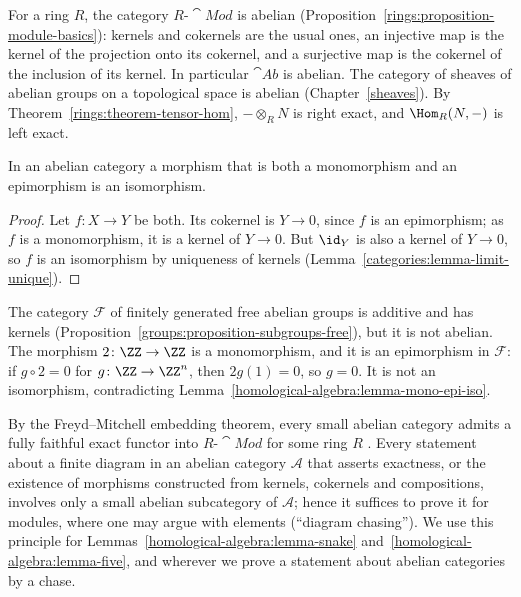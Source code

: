 \begin{example}\label{homological-algebra:example-abelian}
For a ring $R$, the category $R\text{-}\cat{Mod}$ is abelian (Proposition~\ref{rings:proposition-module-basics}):
kernels and cokernels are the usual ones, an injective map is the kernel of the projection onto its cokernel, and a
surjective map is the cokernel of the inclusion of its kernel. In particular $\cat{Ab}$ is abelian. The category of
sheaves of abelian groups on a topological space is abelian (Chapter~\ref{sheaves}). By
Theorem~\ref{rings:theorem-tensor-hom}, $- \otimes_R N$ is right exact, and $\Hom_R(N, -)$ is left exact.
\end{example}

\begin{lemma}\label{homological-algebra:lemma-mono-epi-iso}
In an abelian category a morphism that is both a monomorphism and an epimorphism is an isomorphism.
\end{lemma}

\begin{proof}
Let $f \colon X \to Y$ be both. Its cokernel is $Y \to 0$, since $f$ is an epimorphism; as $f$ is a monomorphism, it is a
kernel of $Y \to 0$. But $\id_Y$ is also a kernel of $Y \to 0$, so $f$ is an isomorphism by uniqueness of kernels
(Lemma~\ref{categories:lemma-limit-unique}).
\end{proof}

\begin{counterexample}\label{homological-algebra:counterexample-not-abelian}
The category $\mathcal{F}$ of finitely generated free abelian groups is additive and has kernels
(Proposition~\ref{groups:proposition-subgroups-free}), but it is not abelian. The morphism $2 \colon \ZZ \to \ZZ$ is a
monomorphism, and it is an epimorphism in $\mathcal{F}$: if $g \circ 2 = 0$ for $g \colon \ZZ \to \ZZ^n$, then $2g(1) = 0$, so
$g = 0$. It is not an isomorphism, contradicting Lemma~\ref{homological-algebra:lemma-mono-epi-iso}.
\end{counterexample}

\begin{remark}\label{homological-algebra:remark-freyd-mitchell}
By the Freyd--Mitchell embedding theorem, every small abelian category admits a fully faithful exact functor into
$R\text{-}\cat{Mod}$ for some ring $R$ \cite[Theorem 1.6.1]{weibel-homological}. Every statement about a finite diagram
in an abelian category $\mathcal{A}$ that asserts exactness, or the existence of morphisms constructed from kernels,
cokernels and compositions, involves only a small abelian subcategory of $\mathcal{A}$; hence it suffices to prove it for
modules, where one may argue with elements (``diagram chasing''). We use this principle for
Lemmas~\ref{homological-algebra:lemma-snake} and~\ref{homological-algebra:lemma-five}, and wherever we prove a
statement about abelian categories by a chase.
\end{remark}


